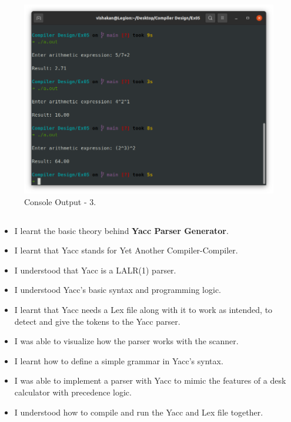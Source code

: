 \documentclass[12pt, a4]{article}
\begin{document}
\newpage
\subsection*{}
\begin{figure}[h]
\centering
\caption{Console Output - 3.}
\includegraphics[scale= 0.5]{Output3.png}
\end{figure}

\newpage
\subsection*{}
\begin{itemize}

\item I learnt the basic theory behind \textbf{Yacc Parser Generator}.
\item I learnt that Yacc stands for Yet Another Compiler-Compiler.
\item I understood that Yacc is a LALR(1) parser.
\item I understood Yacc's basic syntax and programming logic.
\item I learnt that Yacc needs a Lex file along with it to work as intended, to detect and give the tokens to the Yacc parser.
\item I was able to visualize how the parser works with the scanner.
\item I learnt how to define a simple grammar in Yacc's syntax.
\item I was able to implement a parser with Yacc to mimic the features of a desk calculator with precedence logic.
\item I understood how to compile and run the Yacc and Lex file together.
\end{itemize}
\end{document}

